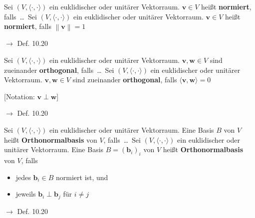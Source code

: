 \documentclass[11pt]{article}
\renewcommand{\cite}[1]{\par\bigskip\hfill{\color{gray}\tiny\(\to\) #1}}
\newcommand*{\norm}[1]{\left\|#1\right\|}
\newcommand*{\scprod}[2]{\langle #1, #2\rangle} %
\renewcommand{\vec}[1]{\mathbf{#1}}
\let\olddots\dots
\renewcommand{\dots}{\,\olddots\,}
\newenvironment{field}{}{\newpage}
\newif\ifnote
\newenvironment{note}{\notetrue}{\notefalse}
\newcommand{\localtag}{}
\newcommand{\globaltag}{}
\newcommand{\uuid}{}
\newcommand{\tags}[1]{
    \ifnote
        \renewcommand{\localtag}{#1}
    \else
        \renewcommand{\globaltag}{#1}
    \fi
    }
\newcommand{\xplain}[1]{\renewcommand{\uuid}{#1}}
\begin{document}
\begin{note}
    \tags{Def}
    \xplain{1794ed94-bdbc-11ec-9d64-0242ac120002}

    \begin{field}
        Sei \((V,\scprod{\cdot}{\cdot})\) ein euklidischer oder unitärer Vektorraum. \(\vec{v}\in V\) heißt \textbf{normiert}, falls \dots
    \end{field}
    \begin{field}
        Sei \((V,\scprod{\cdot}{\cdot})\) ein euklidischer oder unitärer Vektorraum. \(\vec{v}\in V\) heißt \textbf{normiert}, falls \(\norm{\vec{v}} = 1\)
        \cite{Def. 10.20}
    \end{field}

    \begin{field}
        Sei \((V,\scprod{\cdot}{\cdot})\) ein euklidischer oder unitärer Vektorraum. \(\vec{v},\vec{w}\in V\) sind zueinander \textbf{orthogonal}, falls \dots
    \end{field}
    \begin{field}
        Sei \((V,\scprod{\cdot}{\cdot})\) ein euklidischer oder unitärer Vektorraum. \(\vec{v},\vec{w}\in V\) sind zueinander \textbf{orthogonal}, falls \(\scprod{\vec{v}}{\vec{w}} = 0\)

        [Notation: \(\vec{v}\perp\vec{w}\)]
        \cite{Def. 10.20}
    \end{field}

    \begin{field}
        Sei \((V,\scprod{\cdot}{\cdot})\) ein euklidischer oder unitärer Vektorraum. Eine Basis \(B\) von \(V\) heißt \textbf{Orthonormalbasis} von \(V\), falls \dots
    \end{field}
    \begin{field}
        Sei \((V,\scprod{\cdot}{\cdot})\) ein euklidischer oder unitärer Vektorraum. Eine Basis \(B=(\vec{b}_i)_i\) von \(V\) heißt \textbf{Orthonormalbasis} von \(V\), falls
        \begin{itemize}
            \item jedes \(\vec{b}_i\in B\) normiert ist, und
            \item jeweils \(\vec{b}_i\perp\vec{b}_j\) für \(i\neq j\)
        \end{itemize}
        \cite{Def. 10.20}
    \end{field}
\end{note}
\end{document}
